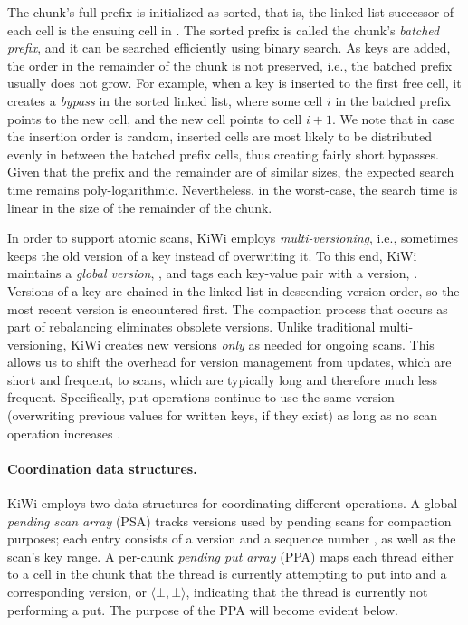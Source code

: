 The chunk's full prefix is initialized as sorted, that is, the linked-list successor of each cell is the ensuing cell in .
The sorted prefix is called the chunk's \emph{batched prefix}, and it can be searched efficiently using binary search.
As keys are added, the order in the remainder of the chunk is not preserved,
i.e., the batched prefix usually does not grow.
For example, when a key is inserted to the first free cell, it creates a \emph{bypass} in the sorted linked list, where some cell $i$ in the batched prefix
points to the new cell, and the new cell points to cell $i+1$.
We note that in case the insertion order is random, inserted cells are most likely to be distributed evenly in between the batched prefix cells, thus
creating fairly short bypasses.
Given that the prefix and the remainder are of similar sizes, the expected search time remains poly-logarithmic.
Nevertheless, in the worst-case, the search time is linear in the size of the remainder of the chunk.

In order to support atomic scans, KiWi employs \emph{multi-versioning}, i.e., sometimes keeps the old version of a key instead of overwriting it. To this end, KiWi maintains a \emph{global version}, , and tags each key-value pair with a version, . Versions of a key are chained in the linked-list in descending version order, so the most recent version is encountered first. 
The compaction process that occurs as part of rebalancing eliminates obsolete versions.
Unlike traditional multi-versioning, KiWi creates new versions \emph{only} as needed for ongoing scans.
This allows us to shift the overhead for version management  from updates, which are short and frequent, to scans, which are typically long and therefore much less frequent. Specifically, put operations continue to use the same version (overwriting previous values for written keys, if they exist) as long as no scan operation increases  .


\paragraph{Coordination data structures.}
KiWi employs two %
data structures for coordinating different operations. 
A global \emph{pending scan array} (PSA) tracks versions used by pending scans for compaction purposes;
each entry consists of a version  and a sequence number , as well as the scan's key range.
A per-chunk \emph{pending put array} (PPA) maps each thread either to a cell in the chunk that the thread is currently attempting to put into and a corresponding version, or $\langle \bot,\bot\rangle$, indicating that the thread is currently not performing a put.
The purpose of the PPA will become evident below.


